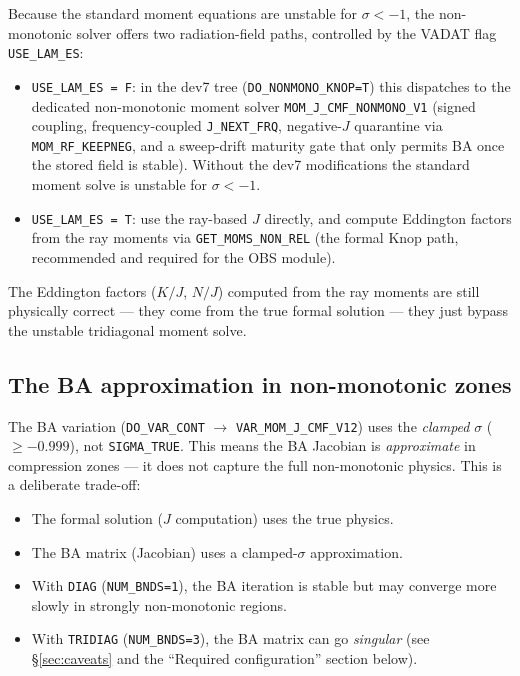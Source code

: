 \documentclass[11pt]{article}
\begin{document}
Because the standard moment equations are unstable for $\sigma < -1$, the
non-monotonic solver offers two radiation-field paths, controlled by the
VADAT flag \texttt{USE\_LAM\_ES}:

\begin{itemize}[nosep]
  \item \texttt{USE\_LAM\_ES = F}: in the dev7 tree
        (\texttt{DO\_NONMONO\_KNOP=T}) this dispatches to the dedicated
        non-monotonic moment solver \texttt{MOM\_J\_CMF\_NONMONO\_V1}
        (signed coupling, frequency-coupled \texttt{J\_NEXT\_FRQ},
        negative-$J$ quarantine via \texttt{MOM\_RF\_KEEPNEG}, and a
        sweep-drift maturity gate that only permits BA once the stored
        field is stable).  Without the dev7 modifications the standard
        moment solve is unstable for $\sigma < -1$.
  \item \texttt{USE\_LAM\_ES = T}: use the ray-based $J$ directly, and
        compute Eddington factors from the ray moments via
        \texttt{GET\_MOMS\_NON\_REL} (the formal Knop path, recommended
        and required for the OBS module).
\end{itemize}

The Eddington factors ($K/J$, $N/J$) computed from the ray moments are
still physically correct --- they come from the true formal solution ---
they just bypass the unstable tridiagonal moment solve.

\subsection{The BA approximation in non-monotonic zones}

The BA variation (\texttt{DO\_VAR\_CONT} $\to$
\texttt{VAR\_MOM\_J\_CMF\_V12}) uses the \emph{clamped} $\sigma$
($\ge -0.999$), not \texttt{SIGMA\_TRUE}.  This means the BA Jacobian is
\emph{approximate} in compression zones --- it does not capture the full
non-monotonic physics.  This is a deliberate trade-off:

\begin{itemize}[nosep]
  \item The formal solution ($J$ computation) uses the true physics.
  \item The BA matrix (Jacobian) uses a clamped-$\sigma$ approximation.
  \item With \texttt{DIAG} (\texttt{NUM\_BNDS=1}), the BA iteration is
        stable but may converge more slowly in strongly non-monotonic
        regions.
  \item With \texttt{TRIDIAG} (\texttt{NUM\_BNDS=3}), the BA matrix can
        go \emph{singular} (see \S\ref{sec:caveats} and the
        ``Required configuration'' section below).
\end{itemize}
\end{document}
